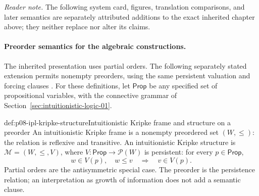 \noindent\textit{Reader note.} The following system card, figures, translation
comparisons, and later semantics are separately attributed additions to
the exact inherited chapter above; they neither replace nor alter its claims.

\paragraph{Preorder semantics for the algebraic constructions.}
The inherited presentation uses partial orders. The following separately
stated extension permits nonempty preorders, using the same persistent
valuation and forcing clauses
\cite{Kripke1965,TroelstraSchwichtenberg2000}.
For these definitions, let \(\mathsf{Prop}\) be any specified set of
propositional variables, with the connective grammar of
Section~\ref{sec:intuitionistic-logic-01}.

\begin{hbdefinition}{def:p08-ipl-kripke-structure}{Intuitionistic Kripke frame and structure on a preorder}
An intuitionistic Kripke frame is a nonempty preordered set
\((W,\leq)\): the relation is reflexive and transitive.
An intuitionistic Kripke structure is
\(\mathcal M=(W,\leq,V)\), where
\(V:\mathsf{Prop}\to\mathcal P(W)\) is persistent:
for every \(p\in\mathsf{Prop}\),
\[
              w\in V(p),\quad w\leq v
                     \quad\Longrightarrow\quad v\in V(p).
\]
Partial orders are the antisymmetric special case.
The preorder is the persistence relation; an interpretation as growth
of information does not add a semantic clause.
\end{hbdefinition}

